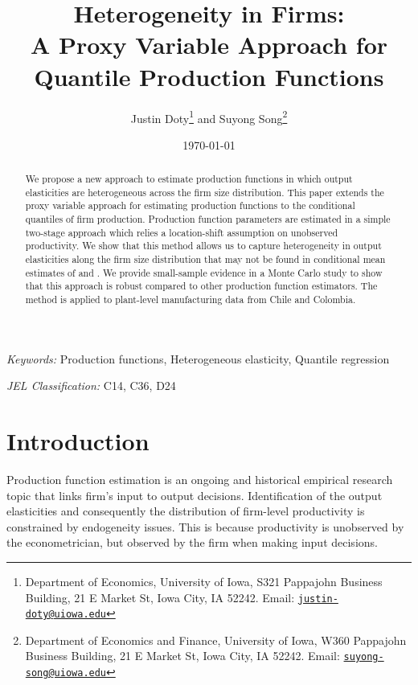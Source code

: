 \documentclass[11pt]{article}
\begin{document}
\title{Heterogeneity in Firms: \\
A Proxy Variable Approach for Quantile Production Functions
}

\author{Justin Doty\thanks{Department of Economics, University of Iowa, S321 Pappajohn Business Building, 21 E Market St, Iowa City, IA 52242. Email: \href{mailto:justin-doty@uiowa.edu}{\texttt{justin-doty@uiowa.edu}}} and Suyong Song\thanks{Department of Economics and Finance, University of Iowa, W360 Pappajohn Business Building, 21 E Market St, Iowa City, IA 52242. Email: \href{mailto:suyong-song@uiowa.edu}{\texttt{suyong-song@uiowa.edu}}}
}

\date {\today}
\maketitle


\begin{abstract}
We propose a new approach to estimate production functions in which output elasticities are heterogeneous across the firm size distribution. 
This paper extends the proxy variable approach for estimating production functions to the conditional quantiles of firm production. Production function parameters are estimated in a simple two-stage approach which relies a location-shift assumption on unobserved productivity. We show that this method allows us to capture heterogeneity in output elasticities along the firm size distribution that may not be found in conditional mean estimates of \cite{Levinsohn2003} and \cite{Ackerberg2015}. We provide small-sample evidence in a Monte Carlo study to show that this approach is robust compared to other production function estimators. The method is applied to plant-level manufacturing data from Chile and Colombia.
\end{abstract}


\textit{Keywords:} Production functions, Heterogeneous elasticity, Quantile regression

\textit{JEL Classification:} C14, C36, D24



\baselineskip25pt

\onehalfspacing

\section{Introduction}

Production function estimation is an ongoing and historical empirical research topic that links firm's input to output decisions. Identification of the output elasticities and consequently the distribution of firm-level productivity is constrained by endogeneity issues. This is because productivity is unobserved by the econometrician, but observed by the firm when making input decisions. 
\end{document}
